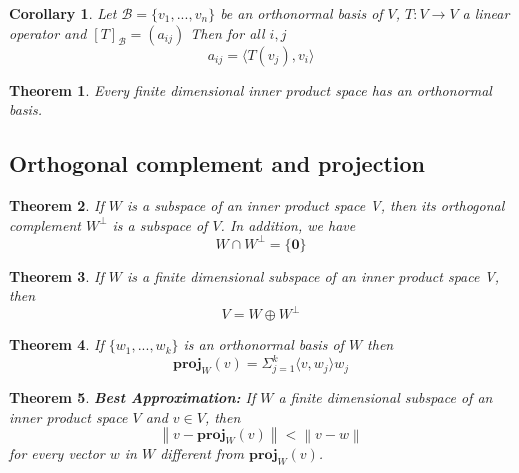 \documentclass{article}
\newcommand{\norm}[1]{\left\lVert#1\right\rVert}
\newcommand{\innerproduct}[1]{\langle#1\rangle}
\newtheorem{theorem}{Theorem}[section]
\newtheorem{corollary}{Corollary}[theorem]
\numberwithin{theorem}{subsection} %
\numberwithin{definition}{subsection} %
\begin{document}
\begin{corollary}

    Let $ \mathcal{B} = \{v_1,...,v_n\}$ be an orthonormal basis of $V$,
    $T:V\rightarrow V$ a linear operator and $[T]_\mathcal{B} = (a_{ij})$ Then for all $i,j$ \\
    \begin{equation*}
    a_{ij}=\innerproduct{T(v_j), v_i}
    \end{equation*}
\end{corollary}

\begin{theorem}
    Every finite dimensional inner product space has an orthonormal basis.
\end{theorem}



\subsection{Orthogonal complement and projection}
\begin{theorem}
    If $W$ is a subspace of an inner product space V, then its orthogonal complement
    $W^{\perp}$ is a subspace of $V$. In addition, we have
    \begin{equation*}
        W \cap W^{\perp} = \{\mathbf{0}\}
    \end{equation*}
\end{theorem}

\begin{theorem}
    If $W$ is a finite dimensional subspace of an inner product space V, then
    \begin{equation*}
        V = W \oplus W^{\perp} 
    \end{equation*}
\end{theorem}

\begin{theorem}
    If $\{w_1, ..., w_k\}$ is an orthonormal basis of $W$ then 
    \begin{equation*}
        \mathbf{proj}_W(v) = \Sigma^k_{j=1} \innerproduct{v,w_j}w_j
    \end{equation*}
\end{theorem}


\begin{theorem} 
    \textbf{Best Approximation:}
    If $W$ a finite dimensional subspace of an inner product space $V$ and $v \in V$, then
    \begin{equation*}
        \norm{v-\mathbf{proj}_W(v)} < \norm{v-w}
    \end{equation*}
    for every vector $w$ in $W$ different from $\mathbf{proj}_W(v)$.
\end{theorem}
\end{document}
